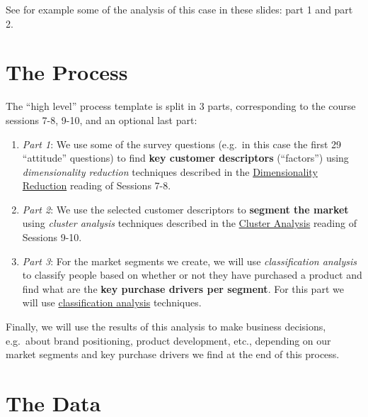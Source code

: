 \documentclass[
]{article}
\begin{document}
See for example some of the analysis of this case in these slides: part
1 and part 2.

\clearpage

\hypertarget{the-process}{%
\section{The Process}\label{the-process}}

The ``high level'' process template is split in 3 parts, corresponding
to the course sessions 7-8, 9-10, and an optional last part:

\begin{enumerate}
\def\labelenumi{\arabic{enumi}.}
\item
  \emph{Part 1}: We use some of the survey questions (e.g.~in this case
  the first 29 ``attitude'' questions) to find \textbf{key customer
  descriptors} (``factors'') using \emph{dimensionality reduction}
  techniques described in the
  \href{http://inseaddataanalytics.github.io/INSEADAnalytics/CourseSessions/Sessions23/FactorAnalysisReading.html}{Dimensionality
  Reduction} reading of Sessions 7-8.
\item
  \emph{Part 2}: We use the selected customer descriptors to
  \textbf{segment the market} using \emph{cluster analysis} techniques
  described in the
  \href{http://inseaddataanalytics.github.io/INSEADAnalytics/CourseSessions/Sessions45/ClusterAnalysisReading.html}{Cluster
  Analysis} reading of Sessions 9-10.
\item
  \emph{Part 3}: For the market segments we create, we will use
  \emph{classification analysis} to classify people based on whether or
  not they have purchased a product and find what are the \textbf{key
  purchase drivers per segment}. For this part we will use
  \href{http://inseaddataanalytics.github.io/INSEADAnalytics/CourseSessions/ClassificationProcessCreditCardDefault.html}{classification
  analysis} techniques.
\end{enumerate}

Finally, we will use the results of this analysis to make business
decisions, e.g.~about brand positioning, product development, etc.,
depending on our market segments and key purchase drivers we find at the
end of this process.

\clearpage

\hypertarget{the-data}{%
\section{The Data}\label{the-data}}
\end{document}
